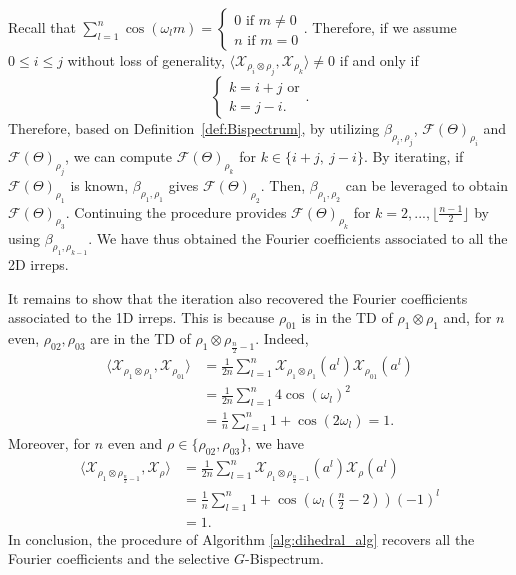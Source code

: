 \documentclass{article}
\theoremstyle{plain}
\theoremstyle{definition}
\theoremstyle{remark}
\begin{document}
Recall that $\sum_{l=1}^n\cos(\omega_l m)=\begin{cases}
        0 \text{ if } m\neq 0\\
        n \text{ if } m = 0
    \end{cases}$. Therefore, if we assume $0\leq i\leq j$ without loss of generality, $ \langle \mathcal{X}_{\rho_i\otimes\rho_j},\mathcal{X}_{\rho_k}\rangle\neq 0$ if and only if
\begin{equation*}
    \begin{cases}
        k = i+j \text{ or}\\
        k = j-i.
    \end{cases}.
\end{equation*}
Therefore, based on Definition~\ref{def:Bispectrum}, by utilizing $\beta_{\rho_i,\rho_j}$, $\mathcal{F}(\Theta)_{\rho_i}$ and $\mathcal{F}(\Theta)_{\rho_j}$, we can compute  $\mathcal{F}(\Theta)_{\rho_k}$ for $k\in\{i+j,\ j-i\}$. By iterating, if $\mathcal{F}(\Theta)_{\rho_1}$ is known,  $\beta_{\rho_1,\rho_1}$ gives $\mathcal{F}(\Theta)_{\rho_2}$. Then, $\beta_{\rho_1,\rho_2}$ can be leveraged to obtain  $\mathcal{F}(\Theta)_{\rho_3}$. Continuing the procedure provides $\mathcal{F}(\Theta)_{\rho_k}$ for $k=2,...,\lfloor \frac{n-1}{2}\rfloor$ by using $\beta_{\rho_1,\rho_{k-1}}$. We have thus obtained the Fourier coefficients associated to all the 2D irreps.

It remains to show that the iteration also recovered the Fourier coefficients associated to the 1D irreps. This is because $\rho_{01}$ is in the TD of $\rho_1\otimes\rho_1$ and, for $n$ even, $\rho_{02}, \rho_{03}$ are in the TD of $\rho_1\otimes\rho_{\frac{n}{2}-1}$. Indeed,
\begin{align*}
    \langle \mathcal{X}_{\rho_1\otimes\rho_1},\mathcal{X}_{\rho_{01}}\rangle &=\frac{1}{2n}\sum_{l=1}^n \mathcal{X}_{\rho_1\otimes\rho_1}(a^l)\mathcal{X}_{\rho_{01}}(a^l)\\
    &=\frac{1}{2n}\sum_{l=1}^n 4\cos(\omega_l)^2\\
    &=\frac{1}{n}\sum_{l=1}^n 1+\cos(2\omega_l)=1.
\end{align*}
Moreover, for $n$ even and $\rho\in\{\rho_{02}, \rho_{03}\}$, we have
\begin{align*}
    \langle \mathcal{X}_{\rho_1\otimes\rho_{\frac{n}{2}-1}},\mathcal{X}_\rho\rangle &=\frac{1}{2n}\sum_{l=1}^n \mathcal{X}_{\rho_1\otimes\rho_{\frac{n}{2}-1}}(a^l)\mathcal{X}_\rho(a^l)\\
    &=\frac{1}{n}\sum_{l=1}^n 1+\cos\left(\omega_l\left(\frac{n}{2}-2\right)\right)(-1)^l\\
    &=1.
\end{align*}
In conclusion, the procedure of Algorithm \ref{alg:dihedral_alg} recovers all the Fourier coefficients and the selective $G$-Bispectrum.
\end{document}
